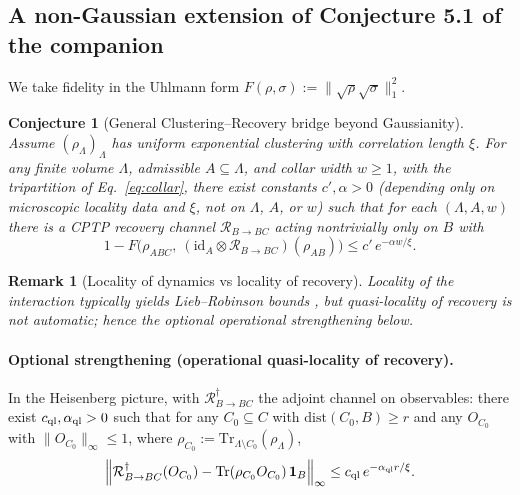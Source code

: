 \documentclass[11pt]{article}
\newtheorem{conjecture}{Conjecture}
\newtheorem{remark}{Remark}
\newcommand{\dist}{\mathrm{dist}}
\newcommand{\Tr}{\mathrm{Tr}}
\begin{document}
\subsection{A non-Gaussian extension of Conjecture 5.1 of the companion}

We take fidelity in the Uhlmann form
$F(\rho,\sigma) := \|\sqrt{\rho}\sqrt{\sigma}\|_1^2$.

\begin{conjecture}[General Clustering--Recovery bridge beyond Gaussianity]
\label{conj:bridge}
Assume $(\rho_\Lambda)_\Lambda$ has uniform exponential clustering with
correlation length $\xi$. For any finite volume $\Lambda$, admissible
$A \subseteq \Lambda$, and collar width $w \ge 1$, with the tripartition of
Eq.~\eqref{eq:collar}, there exist constants $c', \alpha > 0$ (depending only
on microscopic locality data and $\xi$, not on $\Lambda$, $A$, or $w$) such
that for each $(\Lambda, A, w)$ there is a CPTP recovery channel
$\mathcal{R}_{B\to BC}$ acting nontrivially only on $B$ with
\begin{equation}
1 - F\bigl(\rho_{ABC},\ (\mathrm{id}_A \otimes \mathcal{R}_{B\to BC})(\rho_{AB})\bigr)
\le c'\, e^{-\alpha w/\xi}.
\end{equation}
\end{conjecture}

\begin{remark}[Locality of dynamics vs locality of recovery]
Locality of the interaction typically yields Lieb--Robinson bounds \cite{LR},
but quasi-locality of \emph{recovery} is not automatic; hence the optional
operational strengthening below.
\end{remark}

\paragraph{Optional strengthening (operational quasi-locality of recovery).}
In the Heisenberg picture, with $\mathcal{R}^\dagger_{B\to BC}$ the adjoint
channel on observables: there exist $c_{\rm ql}, \alpha_{\rm ql} > 0$ such
that for any $C_0 \subseteq C$ with $\dist(C_0, B) \ge r$ and any $O_{C_0}$
with $\|O_{C_0}\|_\infty \le 1$, where
$\rho_{C_0} := \Tr_{\Lambda\setminus C_0}(\rho_\Lambda)$,
\begin{equation}
\Bigl\| \mathcal{R}^\dagger_{B\to BC}(O_{C_0})
 - \Tr(\rho_{C_0} O_{C_0})\, \mathbf{1}_B \Bigr\|_\infty
\le c_{\rm ql}\, e^{-\alpha_{\rm ql} r/\xi}.
\end{equation}
\end{document}
